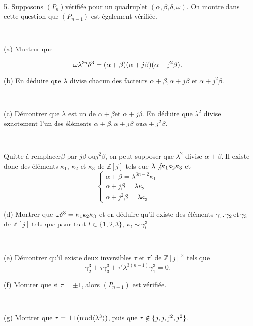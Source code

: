 \

5. Supposons $(P_n)$v{\'e}rifi{\'e}e pour un quadruplet $(\alpha, \beta,
\delta, \omega)$. On montre dans cette question que $(P_{n - 1})$ est
{\'e}galement v{\'e}rifi{\'e}e.

\

\quad (a) Montrer que


\[ \nonconverted{minus} \omega \lambda^{3 n} \delta^3 = (\alpha + \beta)
   (\alpha + j \beta) (\alpha + j^2 \beta) . \]


\quad (b) En d{\'e}duire que $\lambda$ divise chacun des facteurs $\alpha +
\beta, \alpha + j \beta$ et $\alpha + j^2 \beta$.

\

\quad (c) D{\'e}montrer que $\lambda$ est un de $\alpha +
\beta$et $\alpha + j \beta$. En d{\'e}duire que $\lambda^2$ divise exactement
l'un des {\'e}l{\'e}ments $\alpha + \beta, \alpha + j \beta$ ou$\alpha + j^2
\beta$.

\

Quitte {\`a} remplacer$\beta$ par $j \beta$ ou$j^2 \beta$, on peut supposer
que $\lambda^2$ divise $\alpha + \beta$. Il existe donc des {\'e}l{\'e}ments
$\kappa_1$, $\kappa_2$ et $\kappa_3$ de $\mathbb{Z}[j]$ tels que $\lambda
\not{| \nobracket} \kappa_1 \kappa_2 \kappa_3$ et
\[ \left\{\begin{array}{l}
     \alpha + \beta = \lambda^{3 n - 2} \kappa_1\\
     \alpha + j \beta = \lambda \kappa_2\\
     \alpha + j^2 \beta = \lambda \kappa_3
   \end{array}\right. \]


\quad (d) Montrer que $\nonconverted{minus} \omega \delta^3 = \kappa_1
\kappa_2 \kappa_3$ et en d{\'e}duire qu'il existe des {\'e}l{\'e}ments
$\gamma_1, \gamma_2 \tmop{et} \gamma_3$ de $\mathbb{Z}[j]$ tels que pour tout
$l \in \{1, 2, 3\}$, $\kappa_l \sim \gamma^3_l$.

\

\quad (e) D{\'e}montrer qu'il existe deux inversibles $\tau$ et $\tau'$ de
$\mathbb{Z}[j]^{\times}$ tels que
\[ \gamma^3_2 + \tau \gamma^3_3 + \tau' \lambda^{3 (n - 1)} \gamma^3_1 = 0.
\]
\quad

\quad (f) Montrer que si $\tau = \pm 1$, alors $(P_{n - 1})$ est
v{\'e}rifi{\'e}e.



\

\quad (g) Montrer que $\tau = \pm 1 (\tmop{mod} \langle \lambda^3 \rangle)$,
puis que $\tau \nin \{j, \nonconverted{minus} j, j^2, \nonconverted{minus} j^2
\}$.

